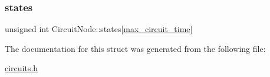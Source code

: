 \mbox{\label{structCircuitNode_a8f10dc142952b047ec1985c8178dcd19}} 
\subsubsection{\texorpdfstring{states}{states}}
{\footnotesize\ttfamily unsigned int Circuit\+Node\+::states\mbox{[}\hyperlink{circuits_8h_aa7deac37d97b85aae9a379c55f711954}{max\+\_\+circuit\+\_\+time}\mbox{]}}



The documentation for this struct was generated from the following file\+:\begin{DoxyCompactItemize}
\item 
\hyperlink{circuits_8h}{circuits.\+h}\end{DoxyCompactItemize}
